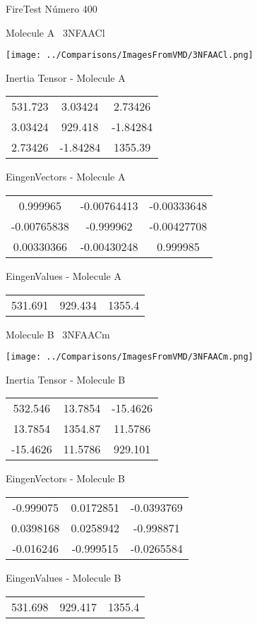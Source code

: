 \vtab[-3cm]
\begin{center}
{\large FireTest \tab Número 400}
\end{center}
\begin{multicols}{2}
\begin{center}

Molecule A \
3NFAACl

\texttt{[image: ../Comparisons/ImagesFromVMD/3NFAACl.png]}

Inertia Tensor - Molecule A \\
\begin{tabular}{|c c c|}
531.723	 & 	3.03424	 & 	2.73426	 \\
3.03424	 & 	929.418	 & 	-1.84284	 \\
2.73426	 & 	-1.84284	 & 	1355.39
\end{tabular}

\vtab
 EingenVectors - Molecule A     \\
\begin{tabular}{|c c c|}
0.999965	 & 	-0.00764413	 & 	-0.00333648	 \\
-0.00765838	 & 	-0.999962	 & 	-0.00427708	 \\
0.00330366	 & 	-0.00430248	 & 	0.999985
\end{tabular}

\vtab
 EingenValues - Molecule A     \\
\begin{tabular}{|c c c|}
531.691	 & 	929.434	 & 	1355.4	 \\
\end{tabular}
\columnbreak

Molecule B \
3NFAACm

\texttt{[image: ../Comparisons/ImagesFromVMD/3NFAACm.png]}

Inertia Tensor - Molecule B \\
\begin{tabular}{|c c c|}
532.546	 & 	13.7854	 & 	-15.4626	 \\
13.7854	 & 	1354.87	 & 	11.5786	 \\
-15.4626	 & 	11.5786	 & 	929.101
\end{tabular}

\vtab
 EingenVectors - Molecule B     \\
\begin{tabular}{|c c c|}
-0.999075	 & 	0.0172851	 & 	-0.0393769	 \\
0.0398168	 & 	0.0258942	 & 	-0.998871	 \\
-0.016246	 & 	-0.999515	 & 	-0.0265584
\end{tabular}

\vtab
 EingenValues - Molecule B     \\
\begin{tabular}{|c c c|}
531.698	 & 	929.417	 & 	1355.4	 \\
\end{tabular}

\end{center}
\end{multicols}

